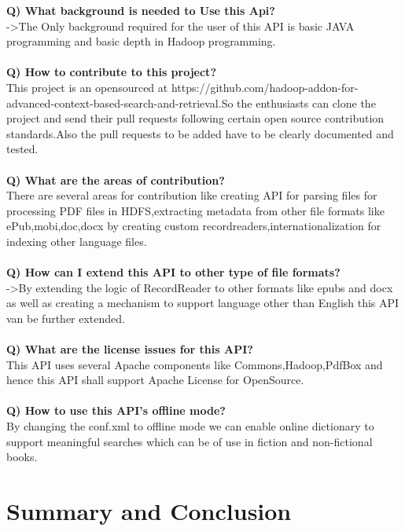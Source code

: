 \documentclass[oneside,a4paper,12pt]{report}
\begin{document}
{\noindent\textbf{Q) What background is needed to Use this Api?}\\
->The Only background required for the user of this API is basic JAVA programming and basic depth in Hadoop programming.\\\\

\noindent\textbf{Q) How to contribute to this project?}\\
This project is an opensourced at https://github.com/hadoop-addon-for-advanced-context-based-search-and-retrieval.So the enthusiasts can clone the project and send their pull requests following certain open source contribution standards.Also the pull requests to be added have to be clearly documented and tested.\\\\

\noindent\textbf{Q) What are the areas of contribution?}\\
There are several areas for contribution like creating API for parsing files for processing PDF files in HDFS,extracting metadata from other file formats like ePub,mobi,doc,docx by creating custom recordreaders,internationalization for indexing other language files.\\\\

\noindent\textbf{Q) How can I extend this API to other type of file formats?}\\
->By extending the logic of RecordReader to other formats like epubs and docx as well as creating a mechanism to support language other than English this API van be further extended.\\\\

\noindent\textbf{Q) What are the license issues for this API?}\\
This API uses several Apache components like Commons,Hadoop,PdfBox and hence this API shall support Apache License for OpenSource.\\\\

\noindent\textbf{Q) How to use this API's offline mode?}\\
By changing the conf.xml to offline mode we can enable online dictionary to support meaningful searches which can be of use in fiction and non-fictional books.


\chapter{Summary and Conclusion}
}
\end{document}
